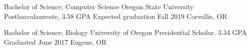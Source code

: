 \showoff
{Bachelor of Science; Computer Science}
{Oregon State University Postbaccalaureate, 3.58 GPA}
{Expected graduation Fall 2019}
{Corvallis, OR}

\myBreak

\showoff
{Bachelor of Science; Biology}
{University of Oregon Presidential Scholar, 3.34 GPA}
{Graduated June 2017}
{Eugene, OR}

\medbreak
